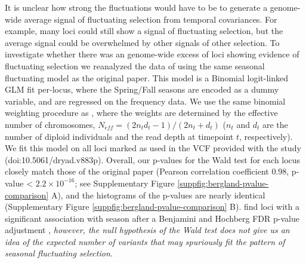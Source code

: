 \documentclass[11pt]{article}
\newcommand{\vb}[1]{{\it \color{blue} #1}}
\begin{document}
It is unclear how strong the fluctuations would have to be to generate a
genome-wide average signal of fluctuating selection from temporal covariances.
For example, many loci could still show a signal of fluctuating selection, but
the average signal could be overwhelmed by other signals of other selection. To
investigate whether there was an genome-wide excess of loci showing evidence of
fluctuating selection we reanalyzed the data of \parencite{Bergland2014-ij}
using the same seasonal fluctuating model as the original paper. This model is
a Binomial logit-linked GLM fit per-locus, where the Spring/Fall seasons are
encoded as a dummy variable, and are regressed on the frequency data. We use
the same binomial weighting procedure as \textcite{Bergland2014-ij}, where the
weights are determined by the effective number of chromosomes, $N_{eff} = (2
n_t d_t - 1) / (2 n_t + d_t)$ ($n_t$ and $d_t$ are the number of diploid
individuals and the read depth at timepoint $t$, respectively). We fit this
model on all loci marked as used in the VCF provided with the
\textcite{Bergland2014-ij} study (doi:10.5061/dryad.v883p). Overall, our
p-values for the Wald test for each locus closely match those of the original
paper (Pearson correlation coefficient 0.98, p-value < $2.2 \times 10^{-16}$;
see Supplementary Figure \ref{suppfig:bergland-pvalue-comparison} A), and the
histograms of the p-values are nearly identical (Supplementary Figure
\ref{suppfig:bergland-pvalue-comparison} B). \textcite{Bergland2014-ij} find
loci with a significant association with season after a Benjamini and Hochberg
FDR p-value adjustment \parencite{Benjamini1995-jy}, \vb{however, the null
hypothesis of the Wald test does not give us an idea of the expected number of
variants that may spuriously fit the pattern of seasonal fluctuating
selection.}
\end{document}
